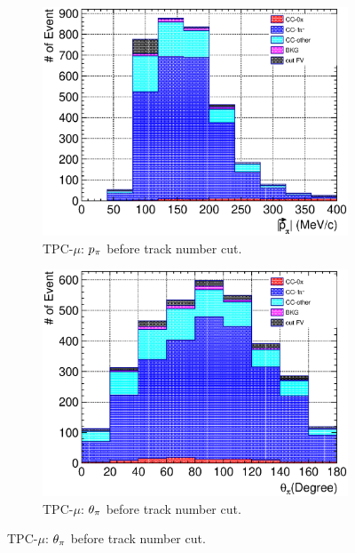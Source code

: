             \begin{figure}
               \centering
               \begin{subfigure}{\dbfigwid\textwidth}
                    \includegraphics[width=\textwidth]{figures/sel/TPCmu_p_pi_stack_al8.eps}
                    \caption{TPC-$\mu$: $p_{\pi}$ before track number cut.}
                    \label{subfig:tlpi-ppi-bf-trknumcut-tpc}
               \end{subfigure}
               \begin{subfigure}{\dbfigwid\textwidth}
                    \includegraphics[width=\textwidth]{figures/sel/TPCmu_theta_pi_stack_al8.eps}
                    \caption{TPC-$\mu$: $\theta_{\pi}$ before track number cut.}
                    \label{subfig:tlpi-tpi-bf-trknumcut-tpc}

\end{subfigure}
\end{figure}
